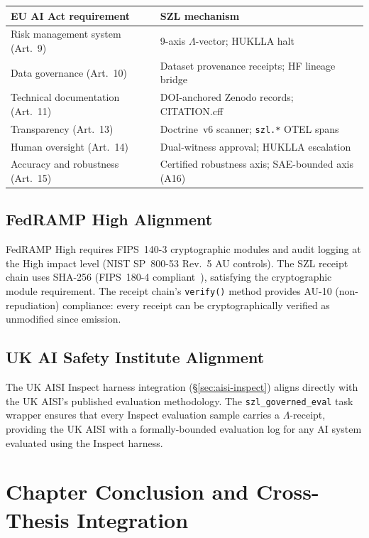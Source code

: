 \begin{center}
\begin{tabular}{ll}
\textbf{EU AI Act requirement} & \textbf{SZL mechanism} \\
\hline
Risk management system (Art.\ 9) & 9-axis $\Lambda$-vector; HUKLLA halt \\
Data governance (Art.\ 10) & Dataset provenance receipts; HF lineage bridge \\
Technical documentation (Art.\ 11) & DOI-anchored Zenodo records; CITATION.cff \\
Transparency (Art.\ 13) & Doctrine~v6 scanner; \texttt{szl.*} OTEL spans \\
Human oversight (Art.\ 14) & Dual-witness approval; HUKLLA escalation \\
Accuracy and robustness (Art.\ 15) & Certified robustness axis; SAE-bounded axis (A16) \\
\end{tabular}
\end{center}

\subsection{FedRAMP High Alignment}
\label{ssec:fedramp-alignment}

FedRAMP High requires FIPS~140-3 cryptographic modules and audit logging
at the High impact level (NIST SP~800-53 Rev.~5 AU controls).  The SZL
receipt chain uses SHA-256 (FIPS~180-4 compliant~\cite{nist_fips_180_4}),
satisfying the cryptographic module requirement.  The receipt chain's
\texttt{verify()} method provides AU-10 (non-repudiation) compliance:
every receipt can be cryptographically verified as unmodified since
emission.

\subsection{UK AI Safety Institute Alignment}
\label{ssec:uk-aisi-alignment}

The UK AISI Inspect harness integration (\S\ref{sec:aisi-inspect}) aligns
directly with the UK AISI's published evaluation methodology.  The
\texttt{szl\_governed\_eval} task wrapper ensures that every Inspect
evaluation sample carries a $\Lambda$-receipt, providing the UK AISI with
a formally-bounded evaluation log for any AI system evaluated using the
Inspect harness.

\section{Chapter Conclusion and Cross-Thesis Integration}
\label{sec:obs-sec-conclusion}

